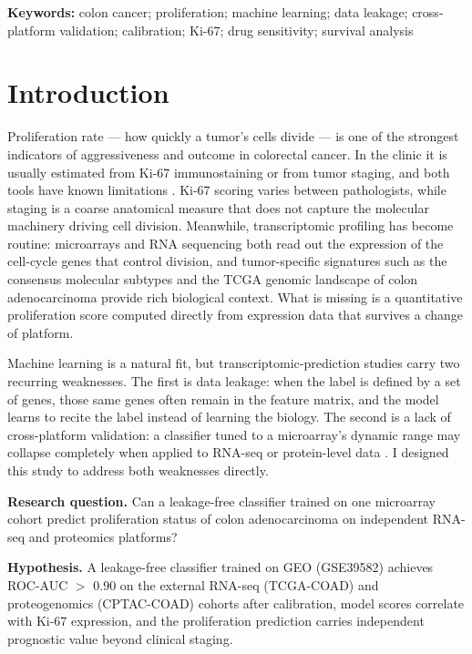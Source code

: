 \documentclass[12pt]{article}
\begin{document}
\textbf{Keywords:} colon cancer; proliferation; machine learning; data leakage; cross-platform validation; calibration; Ki-67; drug sensitivity; survival analysis

\newpage

\section{Introduction}

Proliferation rate --- how quickly a tumor's cells divide --- is one of the strongest indicators of aggressiveness and outcome in colorectal cancer. In the clinic it is usually estimated from Ki-67 immunostaining or from tumor staging, and both tools have known limitations \citep{zeng2025}. Ki-67 scoring varies between pathologists, while staging is a coarse anatomical measure that does not capture the molecular machinery driving cell division. Meanwhile, transcriptomic profiling has become routine: microarrays and RNA sequencing both read out the expression of the cell-cycle genes that control division, and tumor-specific signatures such as the consensus molecular subtypes \citep{guinney2015} and the TCGA genomic landscape of colon adenocarcinoma \citep{tcga2012} provide rich biological context. What is missing is a quantitative proliferation score computed directly from expression data that survives a change of platform.

Machine learning is a natural fit, but transcriptomic-prediction studies carry two recurring weaknesses. The first is data leakage: when the label is defined by a set of genes, those same genes often remain in the feature matrix, and the model learns to recite the label instead of learning the biology. The second is a lack of cross-platform validation: a classifier tuned to a microarray's dynamic range may collapse completely when applied to RNA-seq or protein-level data \citep{vanclaster2019}. I designed this study to address both weaknesses directly.

\textbf{Research question.} Can a leakage-free classifier trained on one microarray cohort predict proliferation status of colon adenocarcinoma on independent RNA-seq and proteomics platforms?

\textbf{Hypothesis.} A leakage-free classifier trained on GEO (GSE39582) achieves ROC-AUC $>$ 0.90 on the external RNA-seq (TCGA-COAD) and proteogenomics (CPTAC-COAD) cohorts after calibration, model scores correlate with Ki-67 expression, and the proliferation prediction carries independent prognostic value beyond clinical staging.
\end{document}
